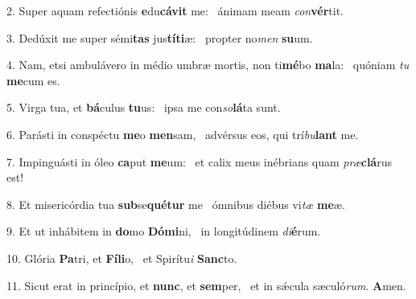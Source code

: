 2. Super aquam refectiónis \textbf{e}du\textbf{cá}\textbf{vit} me: \ast\  ánimam meam \textit{con}\textbf{vér}tit.\

3. Dedúxit me super sémi\textbf{tas} jus\textbf{tí}\textbf{ti}æ: \ast\  propter no\textit{men} \textbf{su}um.\

4. Nam, etsi ambulávero in médio umbræ mortis, non ti\textbf{mé}bo \textbf{ma}la: \ast\  quóniam \textit{tu} \textbf{me}cum es.\

5. Virga tua, et \textbf{bá}culus \textbf{tu}us: \ast\  ipsa me con\textit{so}\textbf{lá}ta sunt.\

6. Parásti in conspéctu \textbf{me}o \textbf{men}sam, \ast\  advérsus eos, qui trí\textit{bu}\textbf{lant} me.\

7. Impinguásti in óleo \textbf{ca}put \textbf{me}um: \ast\  et calix meus inébrians quam \textit{præ}\textbf{clá}rus est!\

8. Et misericórdia tua \textbf{sub}se\textbf{qué}\textbf{tur} me \ast\  ómnibus diébus vi\textit{tæ} \textbf{me}æ.\

9. Et ut inhábitem in \textbf{do}mo \textbf{Dó}\textbf{mi}ni, \ast\  in longitúdinem \textit{di}\textbf{é}rum.\

10. Glória \textbf{Pa}tri, et \textbf{Fí}\textbf{li}o, \ast\  et Spirítu\textit{i} \textbf{Sanc}to.\

11. Sicut erat in princípio, et \textbf{nunc}, et \textbf{sem}per, \ast\  et in sǽcula sæculó\textit{rum}. \textbf{A}men.\

